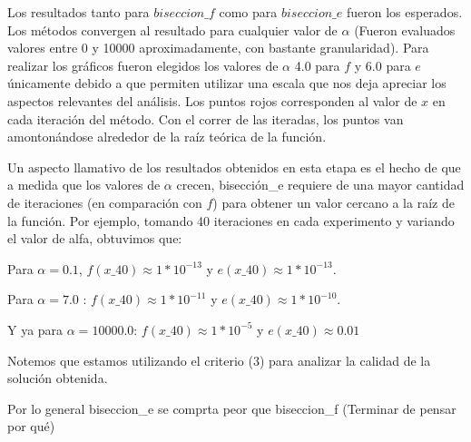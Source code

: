 Los resultados tanto para $biseccion\_f$ como para $biseccion\_e$ fueron los esperados. Los métodos convergen al resultado para cualquier valor de $\alpha$ (Fueron evaluados valores entre 0 y 10000 aproximadamente,
con bastante granularidad). Para realizar los gráficos fueron elegidos los valores de $\alpha$ 4.0 para $f$ y 6.0 para $e$ únicamente debido a que permiten utilizar una escala que nos deja apreciar los aspectos
relevantes del análisis. Los puntos rojos corresponden al valor de $x$ en cada iteración del método. Con el correr de las iteradas, los puntos van amontonándose alrededor de la raíz teórica de la función.

Un aspecto llamativo de los resultados obtenidos en esta etapa es el hecho de que 
a medida que los valores de $\alpha$ crecen, bisección\_e requiere de una mayor cantidad de iteraciones (en comparación con $f$) para obtener un valor cercano a la raíz de la función. Por ejemplo,
tomando 40 iteraciones en cada experimento y variando el valor de alfa, obtuvimos que: 

Para $\alpha = 0.1$, $f(x\_40) \approx 1*10^{-13}$ y $e(x\_40) \approx 1*10^{-13}$. 

Para $\alpha = 7.0$ : 
$f(x\_40) \approx 1*10^{-11}$ y $e(x\_40) \approx 1*10^{-10}$. 

Y ya para $\alpha = 10000.0$: $f(x\_40) \approx 1*10^{-5}$ y $e(x\_40) \approx 0.01$

Notemos que estamos utilizando el criterio (3) para analizar la calidad de la solución obtenida.

Por lo general biseccion\_e se comprta peor que biseccion\_f (Terminar de pensar por qué)


